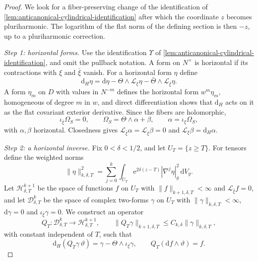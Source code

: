 \begin{proof}
We look for a fiber-preserving change of the identification of \cref{lem:anticanonical-cylindrical-identification} after which the coordinate $z$ becomes pluriharmonic. The logarithm of the flat norm of the defining section is then $-z$, up to a pluriharmonic correction.

\emph{Step 1: horizontal forms.} Use the identification $\Upsilon$ of \cref{lem:anticanonical-cylindrical-identification}, and omit the pullback notation. A form on $N^\times$ is horizontal if its contractions with $\xi$ and $\bar\xi$ vanish. For a horizontal form $\eta$ define
\[
 \mathrm d_H\eta=\mathrm d\eta
       -\Theta\wedge\mathcal L_\xi\eta
       -\bar\Theta\wedge\mathcal L_{\bar\xi}\eta.
\]
A form $\eta_m$ on $D$ with values in $N^{-m}$ defines the horizontal form $w^m\eta_m$, homogeneous of degree $m$ in $w$, and direct differentiation shows that $\mathrm d_H$ acts on it as the flat covariant exterior derivative. Since the fibers are holomorphic,
\[
 \iota_{\bar\xi}\Omega_S=0,\qquad
 \Omega_S=\Theta\wedge\alpha+\beta,
 \qquad\alpha=\iota_\xi\Omega_S,
\]
with $\alpha,\beta$ horizontal. Closedness gives $\mathcal L_{\bar\xi}\alpha=\mathcal L_{\bar\xi}\beta=0$ and $\mathcal L_\xi\beta=\mathrm d_H\alpha$.

\emph{Step 2: a horizontal inverse.} Fix $0<\delta<1/2$, and let $U_T=\{z\geq T\}$. For tensors define the weighted norms
\[
 \|\eta\|_{k,\delta,T}^2
 =\sum_{j=0}^k\int_{U_T}\mathrm e^{2\delta(z-T)}
                    |\nabla^j\eta|_g^2\,\mathrm dV_g.
\]
Let $\mathcal H^{k+1}_{\delta,T}$ be the space of functions $f$ on $U_T$ with $\|f\|_{k+1,\delta,T}<\infty$ and $\mathcal L_{\bar\xi}f=0$, and let $\mathcal D^k_{\delta,T}$ be the space of complex two-forms $\gamma$ on $U_T$ with $\|\gamma\|_{k,\delta,T}<\infty$, $\mathrm d\gamma=0$ and $\iota_{\bar\xi}\gamma=0$. We construct an operator
\[
 Q_T\colon\mathcal D^k_{\delta,T}\longrightarrow\mathcal H^{k+1}_{\delta,T},
 \qquad \|Q_T\gamma\|_{k+1,\delta,T}\leq C_{k,\delta}\|\gamma\|_{k,\delta,T},
\]
with constant independent of $T$, such that
\begin{equation}\label{eq:anticanonical-horizontal-inverse}
 \mathrm d_H(Q_T\gamma\,\vartheta)
 =\gamma-\Theta\wedge\iota_\xi\gamma,
 \qquad Q_T(\mathrm df\wedge\vartheta)=f.
\end{equation}


\end{proof}
